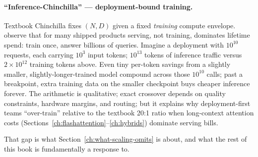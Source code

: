 \paragraph{``Inference-Chinchilla'' --- deployment-bound training.}
Textbook Chinchilla fixes \((N, D)\) given a fixed \emph{training} compute
envelope. \citet{sardana2024beyond} observe that for many shipped products
serving, not training, dominates lifetime spend: train once, answer
billions of queries. Imagine a deployment with \(10^{10}\) requests, each
carrying \(10^{3}\) input tokens; \(10^{13}\) tokens of inference traffic
versus \(2\times 10^{12}\) training tokens above. Even tiny per-token
savings from a slightly smaller, slightly-longer-trained model compound
across those \(10^{10}\) calls; past a breakpoint, extra training data on
the smaller checkpoint buys cheaper inference forever. The arithmetic is
qualitative; exact crossover depends on quality constraints, hardware
margins, and routing; but it explains why deployment-first teams
``over-train'' relative to the textbook 20:1 ratio when long-context
attention costs (Sections~\ref{ch:flashattention}--\ref{ch:hybrids}) dominate serving bills.

That gap is what Section~\ref{ch:what-scaling-omits} is about, and what
the rest of this book is fundamentally a response to.

